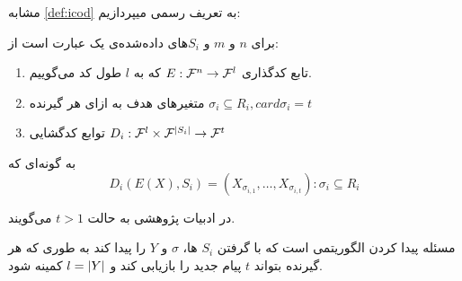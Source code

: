 مشابه
\autoref{def:icod}
به تعریف رسمی
\picodt
میپردازیم:
\begin{definition}[\picodt]
    \label{def:picodt}
    برای
    $n$
    و
    $m$
    و
    $S_i$های داده‌شده‌ی یک
    \picodt
    عبارت است از:
    \begin{enumerate}
        \item
        تابع کدگذاری
        $E: \mathcal{F}^n \rightarrow \mathcal{F}^l$
        که به
        $l$
        طول کد می‌گوییم.
        \item متغیرهای هدف به ازای هر گیرنده
        $\sigma_i \subseteq R_i,  card{\sigma_i} = t$
        \item
        توابع کدگشایی
        $D_i: \mathcal{F}^l \times \mathcal{F}^{\left|{S_i}\right|} \rightarrow \mathcal{F}^t$
    \end{enumerate}
    به گونه‌ای که
    $$D_i(E(X), S_i) = (X_{\sigma_{i,1}}, \ldots, X_{\sigma_{i,t}}): \sigma_i \subseteq R_i$$
\end{definition}

در ادبیات پژوهشی به حالت
$t > 1$
می‌گویند.

مسئله
\picodt
پیدا کردن الگوریتمی است که با گرفتن
$S_i$
ها،
$\sigma$
و
$Y$
را پیدا کند به طوری که هر گیرنده بتواند
$t$
پیام جدید را بازیابی کند و
$l = \left|{Y}\right|$
کمینه شود.

